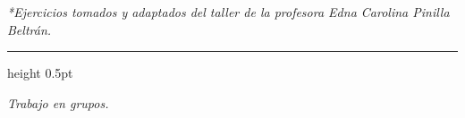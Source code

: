 \documentclass[11pt, letterpaper]{article}
\begin{document}
   \vfill
   \noindent
   \begin{center}
   	\small\textit{*Ejercicios tomados y adaptados del taller de la profesora Edna Carolina Pinilla Beltrán.}
   \end{center}
    
    \vspace{0.5cm}
    {\color{UnalGreen}\hrule height 0.5pt}
    \begin{center}
        \small 
        \textit{Trabajo en grupos.}
    \end{center}
    
\end{document}
